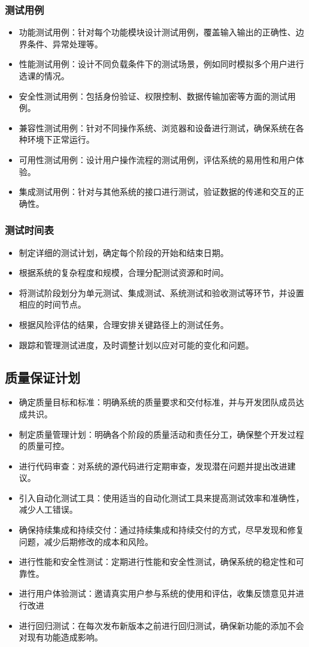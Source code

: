 \documentclass{article}
\begin{document}
\subsubsection{测试用例}
\begin{itemize}
	\item 功能测试用例：针对每个功能模块设计测试用例，覆盖输入输出的正确性、边界条件、异常处理等。
	\item 性能测试用例：设计不同负载条件下的测试场景，例如同时模拟多个用户进行选课的情况。
	\item 安全性测试用例：包括身份验证、权限控制、数据传输加密等方面的测试用例。
	\item 兼容性测试用例：针对不同操作系统、浏览器和设备进行测试，确保系统在各种环境下正常运行。
	\item 可用性测试用例：设计用户操作流程的测试用例，评估系统的易用性和用户体验。
	\item 集成测试用例：针对与其他系统的接口进行测试，验证数据的传递和交互的正确性。
\end{itemize}

\subsubsection{测试时间表}
\begin{itemize}
	\item 制定详细的测试计划，确定每个阶段的开始和结束日期。
	\item 根据系统的复杂程度和规模，合理分配测试资源和时间。
	\item 将测试阶段划分为单元测试、集成测试、系统测试和验收测试等环节，并设置相应的时间节点。
	\item 根据风险评估的结果，合理安排关键路径上的测试任务。
	\item 跟踪和管理测试进度，及时调整计划以应对可能的变化和问题。
\end{itemize}

\subsection{质量保证计划}
\begin{itemize}
	\item 确定质量目标和标准：明确系统的质量要求和交付标准，并与开发团队成员达成共识。
	\item 制定质量管理计划：明确各个阶段的质量活动和责任分工，确保整个开发过程的质量可控。
	\item 进行代码审查：对系统的源代码进行定期审查，发现潜在问题并提出改进建议。
	\item 引入自动化测试工具：使用适当的自动化测试工具来提高测试效率和准确性，减少人工错误。
	\item 确保持续集成和持续交付：通过持续集成和持续交付的方式，尽早发现和修复问题，减少后期修改的成本和风险。
	\item 进行性能和安全性测试：定期进行性能和安全性测试，确保系统的稳定性和可靠性。
	\item 进行用户体验测试：邀请真实用户参与系统的使用和评估，收集反馈意见并进行改进
	\item 进行回归测试：在每次发布新版本之前进行回归测试，确保新功能的添加不会对现有功能造成影响。
\end{itemize}
\end{document}
